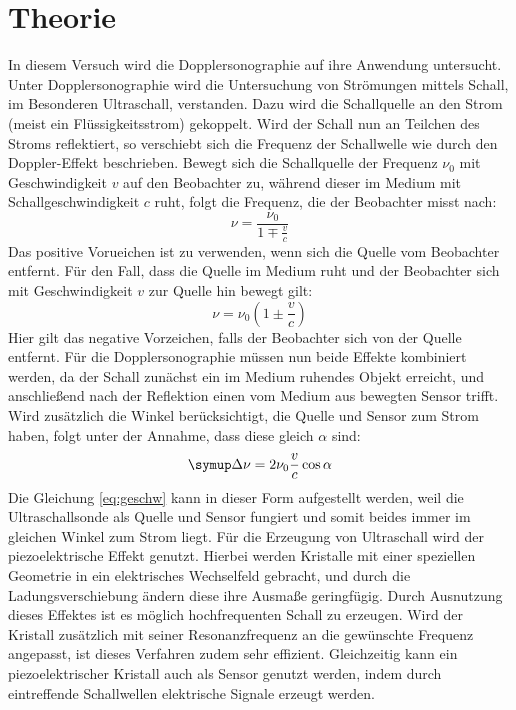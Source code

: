 \section{Theorie}
\label{sec:Theorie}
In diesem Versuch wird die Dopplersonographie auf ihre Anwendung untersucht.
Unter Dopplersonographie wird die Untersuchung von Strömungen mittels Schall, im Besonderen Ultraschall, verstanden.
Dazu wird die Schallquelle an den Strom (meist ein Flüssigkeitsstrom) gekoppelt.
Wird der Schall nun an Teilchen des Stroms reflektiert, so verschiebt sich die Frequenz der Schallwelle wie durch den
Doppler-Effekt beschrieben.
Bewegt sich die Schallquelle der Frequenz $\nu_0$ mit Geschwindigkeit $v$ auf den Beobachter zu,
während dieser im Medium mit Schallgeschwindigkeit $c$ ruht, folgt die Frequenz, die der Beobachter misst nach:
\begin{equation}
	\nu = \frac{\nu_0}{1 \mp \frac{v}{c}}
\end{equation}
Das positive Vorueichen ist zu verwenden, wenn sich die Quelle vom Beobachter entfernt.
Für den Fall, dass die Quelle im Medium ruht und der Beobachter sich mit Geschwindigkeit $v$ zur Quelle hin bewegt gilt:
\begin{equation}
	\nu = \nu_0\left(1\pm\frac{v}{c}\right)
\end{equation}
Hier gilt das negative Vorzeichen, falls der Beobachter sich von der Quelle entfernt.
Für die Dopplersonographie müssen nun beide Effekte kombiniert werden, da der Schall zunächst ein im Medium ruhendes Objekt erreicht,
und anschließend nach der Reflektion einen vom Medium aus bewegten Sensor trifft.
Wird zusätzlich die Winkel berücksichtigt, die Quelle und Sensor zum Strom haben, folgt unter der Annahme, dass diese gleich $\alpha$ sind:
\begin{equation}
	\label{eq:geschw}
	\symup\Delta\nu = 2\nu_0\frac{v}{c}\cos \alpha
\end{equation}
Die Gleichung \eqref{eq:geschw} kann in dieser Form aufgestellt werden, weil die Ultraschallsonde als Quelle und Sensor fungiert und somit beides immer im gleichen Winkel zum Strom liegt.
Für die Erzeugung von Ultraschall wird der piezoelektrische Effekt genutzt.
Hierbei werden Kristalle mit einer speziellen Geometrie in ein elektrisches Wechselfeld gebracht,
und durch die Ladungsverschiebung ändern diese ihre Ausmaße geringfügig.
Durch Ausnutzung dieses Effektes ist es möglich hochfrequenten Schall zu erzeugen.
Wird der Kristall zusätzlich mit seiner Resonanzfrequenz an die gewünschte Frequenz angepasst,
ist dieses Verfahren zudem sehr effizient.
Gleichzeitig kann ein piezoelektrischer Kristall auch als Sensor genutzt werden, indem durch eintreffende Schallwellen
elektrische Signale erzeugt werden.
